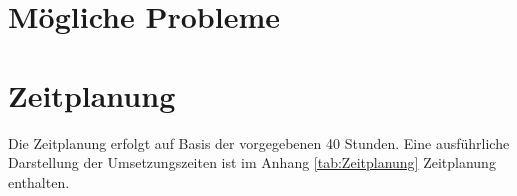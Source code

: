 \section{Mögliche Probleme}
\lipsum[1]

\section{Zeitplanung}
Die Zeitplanung erfolgt auf Basis der vorgegebenen 40 Stunden. Eine ausführliche Darstellung der Umsetzungszeiten ist im Anhang \ref{tab:Zeitplanung} \grqq{}Zeitplanung\grqq{} enthalten.



